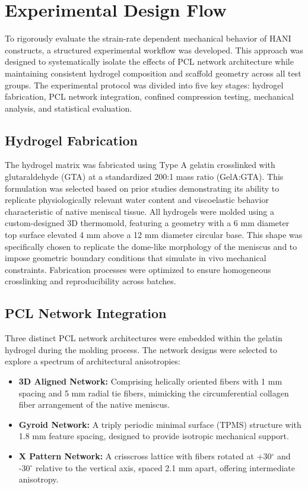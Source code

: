 \section{Experimental Design Flow}

To rigorously evaluate the strain-rate dependent mechanical behavior of HANI constructs, a structured experimental workflow was developed. This approach was designed to systematically isolate the effects of PCL network architecture while maintaining consistent hydrogel composition and scaffold geometry across all test groups. The experimental protocol was divided into five key stages: hydrogel fabrication, PCL network integration, confined compression testing, mechanical analysis, and statistical evaluation.

\subsection{Hydrogel Fabrication}

The hydrogel matrix was fabricated using Type A gelatin crosslinked with glutaraldehyde (GTA) at a standardized 200:1 mass ratio (GelA:GTA). This formulation was selected based on prior studies demonstrating its ability to replicate physiologically relevant water content and viscoelastic behavior characteristic of native meniscal tissue. All hydrogels were molded using a custom-designed 3D thermomold, featuring a geometry with a 6 mm diameter top surface elevated 4 mm above a 12 mm diameter circular base. This shape was specifically chosen to replicate the dome-like morphology of the meniscus and to impose geometric boundary conditions that simulate in vivo mechanical constraints. Fabrication processes were optimized to ensure homogeneous crosslinking and reproducibility across batches.

\subsection{PCL Network Integration}

Three distinct PCL network architectures were embedded within the gelatin hydrogel during the molding process. The network designs were selected to explore a spectrum of architectural anisotropies:

\begin{itemize}
    \item \textbf{3D Aligned Network:} Comprising helically oriented fibers with 1 mm spacing and 5 mm radial tie fibers, mimicking the circumferential collagen fiber arrangement of the native meniscus.
    \item \textbf{Gyroid Network:} A triply periodic minimal surface (TPMS) structure with 1.8 mm feature spacing, designed to provide isotropic mechanical support.
    \item \textbf{X Pattern Network:} A crisscross lattice with fibers rotated at +30$^\circ$ and -30$^\circ$ relative to the vertical axis, spaced 2.1 mm apart, offering intermediate anisotropy.
\end{itemize}

